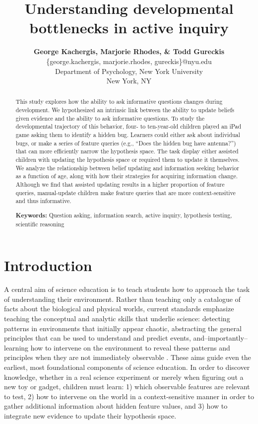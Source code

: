 \documentclass[10pt,letterpaper]{article}
\title{Understanding developmental bottlenecks in active inquiry}
\author{
  {\large \bf George Kachergis, Marjorie Rhodes, \& Todd Gureckis} \\
  \{george.kachergis, marjorie.rhodes, gureckis\}@nyu.edu \\
  Department of Psychology, New York University \\
  New York, NY
}
\begin{document}
\maketitle

\begin{abstract}This study explores how the ability to ask informative questions changes during development. We hypothesized an intrinsic link between the ability to update beliefs given evidence and the ability to ask informative questions. To study the developmental trajectory of this behavior, four- to ten-year-old children played an iPad game asking them to identify a hidden bug. Learners could either ask about individual bugs, or make a series of feature queries (e.g., ``Does the hidden bug have antenna?'') that can more efficiently narrow the hypothesis space. The task display either assisted children with updating the hypothesis space or required them to update it themselves. We analyze the relationship between belief updating and information seeking behavior as a function of age, along with how their strategies for acquiring information change. Although we find that assisted updating results in a higher proportion of feature queries, manual-update children make feature queries that are more context-sensitive and thus informative.

\textbf{Keywords:} 
Question asking, information search, active inquiry, hypothesis testing, scientific reasoning
\end{abstract}


\section{Introduction} 

A central aim of science education is to teach students how to approach the task of understanding their environment. Rather than teaching only a catalogue of facts about the biological and physical worlds, current standards emphasize teaching the conceptual and analytic skills that underlie science: detecting patterns in environments that initially appear chaotic, abstracting the general principles that can be used to understand and predict events, and--importantly--learning how to intervene on the environment to reveal these patterns and principles when they are not immediately observable \cite{Bransford:2000,Donovan:2005,Duschl:2007}. These aims guide even the earliest, most foundational components of science education. In order to discover knowledge, whether in a real science experiment or merely when figuring out a new toy or gadget, children must learn: 1) which observable features are relevant to test, 2) how to intervene on the world in a context-sensitive manner in order to gather additional information about hidden feature values, and 3) how to integrate new evidence to update their hypothesis space.
\end{document}
